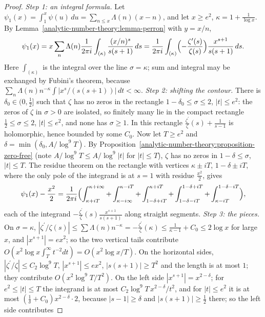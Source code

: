 \begin{proof}
\emph{Step 1: an integral formula.} Let $\psi_1(x) = \int_1^x\psi(u)\,du = \sum_{n \leq x}\Lambda(n)(x - n)$, and let $x \geq e^2$, $\kappa = 1 + \frac{1}{\log x}$. By Lemma~\ref{analytic-number-theory:lemma-perron}
with $y = x/n$,
\[
\psi_1(x) = x\sum_n\Lambda(n)\frac{1}{2\pi i}\int_{(\kappa)}\frac{(x/n)^s}{s(s + 1)}\,ds = \frac{1}{2\pi i}\int_{(\kappa)}\Bigl(-\frac{\zeta^{\prime}(s)}{\zeta(s)}\Bigr)\frac{x^{s+1}}{s(s + 1)}\,ds.
\]
Here $\int_{(\kappa)}$ is the integral over the line $\sigma = \kappa$; sum and integral may be exchanged by Fubini's theorem, because $\sum_n\Lambda(n)n^{-\kappa}\int|x^{s}/(s(s + 1))|\,dt < \infty$.
\emph{Step 2: shifting the contour.} There is $\delta_0 \in (0, \frac12]$ such that $\zeta$ has no zeros in the rectangle $1 - \delta_0 \leq \sigma \leq 2$, $|t| \leq e^2$: the zeros of $\zeta$ in
$\sigma > 0$ are isolated, so finitely many lie in the compact rectangle $\frac12 \leq \sigma \leq 2$, $|t| \leq e^2$, and none has $\sigma \geq 1$. In this rectangle
$\frac{\zeta^{\prime}}{\zeta}(s) + \frac{1}{s - 1}$ is holomorphic, hence bounded by some $C_0$. Now let $T \geq e^2$ and $\delta = \min(\delta_0, A/\log^9T)$. By
Proposition~\ref{analytic-number-theory:proposition-zero-free} (note $A/\log^9T \leq A/\log^9|t|$ for $|t| \leq T$), $\zeta$ has no zeros in $1 - \delta \leq \sigma$, $|t| \leq T$. The residue theorem on the
rectangle with vertices $\kappa \pm iT$, $1 - \delta \pm iT$, where the only pole of the integrand is at $s = 1$ with residue $\frac{x^2}{2}$, gives
\[
\psi_1(x) - \frac{x^2}{2} = \frac{1}{2\pi i}\Bigl(\int_{\kappa + iT}^{\kappa + i\infty} + \int_{\kappa - i\infty}^{\kappa - iT} + \int_{1 - \delta + iT}^{\kappa + iT} + \int_{1 - \delta - iT}^{1 - \delta + iT} + \int_{\kappa - iT}^{1 - \delta - iT}\Bigr),
\]
each of the integrand $-\frac{\zeta^{\prime}}{\zeta}(s)\frac{x^{s+1}}{s(s + 1)}$ along straight segments.
\emph{Step 3: the pieces.} On $\sigma = \kappa$, $|\zeta^{\prime}/\zeta(s)| \leq \sum\Lambda(n)n^{-\kappa} = -\frac{\zeta^{\prime}}{\zeta}(\kappa) \leq \frac{1}{\kappa - 1} + C_0 \leq 2\log x$ for large $x$, and
$|x^{s+1}| = ex^2$; so the two vertical tails contribute $O(x^2\log x\int_T^\infty t^{-2}dt) = O(x^2\log x/T)$. On the horizontal sides, $|\zeta^{\prime}/\zeta| \leq C_2\log^9T$,
$|x^{s+1}| \leq ex^2$, $|s(s + 1)| \geq T^2$ and the length is at most $1$; they contribute $O(x^2\log^9T/T^2)$. On the left side $|x^{s+1}| = x^{2 - \delta}$; for $e^2 \leq |t| \leq T$ the integrand is at most
$C_2\log^9T\,x^{2-\delta}/t^2$, and for $|t| \leq e^2$ it is at most $(\frac1\delta + C_0)x^{2-\delta}\cdot 2$, because $|s - 1| \geq \delta$ and $|s(s + 1)| \geq \frac12$ there; so the left side contributes

\end{proof}
